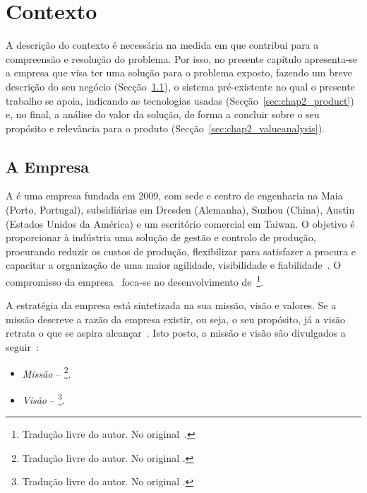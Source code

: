 \chapter{Contexto}
\label{chap:Chapter2}

A descrição do contexto é necessária na medida em que contribui para a compreensão e resolução do problema. Por isso, no presente capítulo apresenta-se a empresa que visa ter uma solução para o problema exposto, fazendo um breve descrição do seu negócio (Secção~\ref{sec:chap2_company}), o sistema pré-existente no qual o presente trabalho se apoia, indicando as tecnologias usadas (Secção~\ref{sec:chap2_product}) e, no final, a análise do valor da solução, de forma a concluir sobre o seu propósito e relevância para o produto (Secção~\ref{sec:chap2_valueanalysis}).  

\section{A Empresa}
\label{sec:chap2_company}

A {\companyname} é uma empresa fundada em 2009, com sede e centro de engenharia na Maia (Porto, Portugal), subsidiárias em Dresden (Alemanha), Suzhou (China), Austin (Estados Unidos da América) e um escritório comercial em Taiwan. O objetivo é proporcionar à indústria uma solução de gestão e controlo de produção, procurando reduzir os custos de produção, flexibilizar para satisfazer a procura e capacitar a organização de uma maior agilidade, visibilidade e fiabilidade~\parencite{cmf_overview}. O compromisso da empresa~\parencite{cmf_overview} foca-se no desenvolvimento de~\footnote{Tradução livre do autor. No original~.}.

A estratégia da empresa está sintetizada na sua missão, visão e valores. Se a missão descreve a razão da empresa existir, ou seja, o seu propósito, já a visão retrata o que se aspira alcançar~\parencite[pp.~65-66]{mission_vision_values_what_do_they_say}. Isto posto, a missão e visão são divulgados a seguir~\parencite{cmf_strategy}: 

\begin{itemize}
    \item 
    {
        \textit{Missão} -- \footnote{Tradução livre do autor. No original .}.
    }
    \item 
    {
        \textit{Visão} -- \footnote{Tradução livre do autor. No original .}.
    }
\end{itemize}

